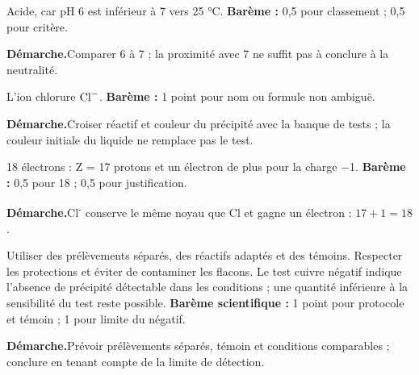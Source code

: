 \par\noindent\begin{minipage}{\linewidth}
Acide, car pH 6 est inférieur à 7 vers 25 °C. \textbf{Barème :} 0,5 pour classement ; 0,5 pour critère.\par
\smallskip\noindent\textbf{Démarche.}\enspace Comparer 6 à 7 ; la proximité avec 7 ne suffit pas à conclure à la neutralité.\par
\end{minipage}\par
\par\noindent\begin{minipage}{\linewidth}
L’ion chlorure $\ce{Cl-}$. \textbf{Barème :} 1 point pour nom ou formule non ambiguë.\par
\smallskip\noindent\textbf{Démarche.}\enspace Croiser réactif et couleur du précipité avec la banque de tests ; la couleur initiale du liquide ne remplace pas le test.\par
\end{minipage}\par
\par\noindent\begin{minipage}{\linewidth}
18 électrons : Z = 17 protons et un électron de plus pour la charge −1. \textbf{Barème :} 0,5 pour 18 ; 0,5 pour justification.\par
\smallskip\noindent\textbf{Démarche.}\enspace Cl\textsuperscript{-} conserve le même noyau que Cl et gagne un électron : $17+1=18$.\par
\end{minipage}\par
\par\noindent\begin{minipage}{\linewidth}
Utiliser des prélèvements séparés, des réactifs adaptés et des témoins. Respecter les protections et éviter de contaminer les flacons. Le test cuivre négatif indique l’absence de précipité détectable dans les conditions ; une quantité inférieure à la sensibilité du test reste possible. \textbf{Barème scientifique :} 1 point pour protocole et témoin ; 1 pour limite du négatif.\par
\smallskip\noindent\textbf{Démarche.}\enspace Prévoir prélèvements séparés, témoin et conditions comparables ; conclure en tenant compte de la limite de détection.\par
{}
\end{minipage}\par
